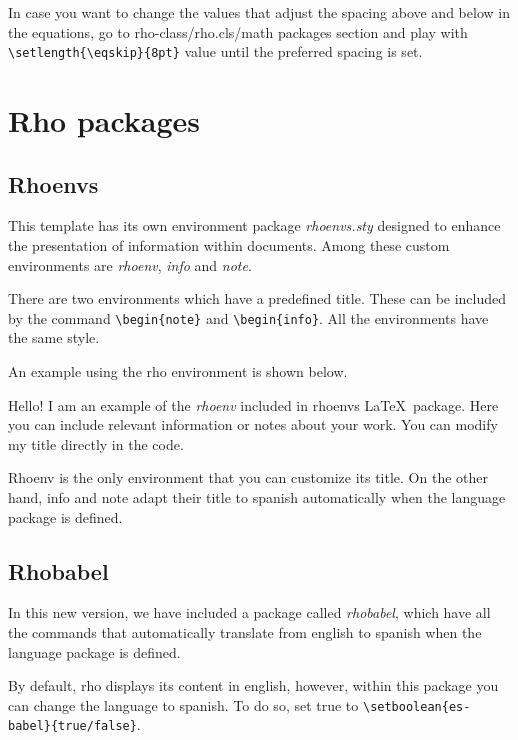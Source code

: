 \documentclass[9pt,a4paper,twoside]{rho-class/rho}
\begin{document}
    In case you want to change the values that adjust the spacing above and below in the equations, go to rho-class/rho.cls/math packages section and play with \verb|\setlength{\eqskip}{8pt}| value until the preferred spacing is set.

\section{Rho packages}

    \subsection{Rhoenvs}
    
        This template has its own environment package \textit{rhoenvs.sty} designed to enhance the presentation of information within documents. Among these custom environments are \textit{rhoenv}, \textit{info} and \textit{note}.
    
        There are two environments which have a predefined title. These can be included by the command \verb|\begin{note}| and \verb|\begin{info}|. All the environments have the same style.
    	
    	An example using the rho environment is shown below.
    
        \begin{rhoenv}[frametitle=Environment with custom title]
            Hello! I am an example of the \textit{rhoenv} included in rhoenvs \LaTeX\ package. Here you can include relevant information or notes about your work. You can modify my title directly in the code.
        \end{rhoenv}
    
        Rhoenv is the only environment that you can customize its title. On the other hand, info and note adapt their title to spanish automatically when the language package is defined.

    \subsection{Rhobabel}

        In this new version, we have included a package called \textit{rhobabel}, which have all the commands that automatically translate from english to spanish when the language package is defined.

        By default, rho displays its content in english, however, within this package you can change the language to spanish. To do so, set true to \verb|\setboolean{es-babel}{true/false}|.
\end{document}

